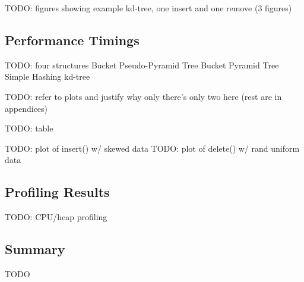 TODO: figures showing example kd-tree, one insert and one remove (3 figures)

\subsection{Performance Timings}

TODO: four structures
	Bucket Pseudo-Pyramid Tree
	Bucket Pyramid Tree
	Simple Hashing
	kd-tree

TODO: refer to plots and justify why only there's only two here (rest are in appendices)

TODO: table

TODO: plot of insert() w/ skewed data
TODO: plot of delete() w/ rand uniform data

\subsection{Profiling Results}

TODO: CPU/heap profiling

\subsection{Summary}

TODO
